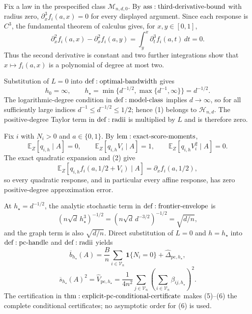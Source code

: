 Fix a law in the prespecified class \(\mathcal M_{n,d,0}\).  By \({\rm ass:third\text{-}derivative\text{-}bound}\) with radius zero, \(\partial_x^3f_i(a,x)=0\) for every displayed argument.  Since each response is \(C^3\), the fundamental theorem of calculus gives, for \(x,y\in[0,1]\),
\[
 \partial_x^2f_i(a,x)-\partial_x^2f_i(a,y)
 =\int_y^x\partial_t^3f_i(a,t)\,dt=0.
\]
Thus the second derivative is constant and two further integrations show that \(x\mapsto f_i(a,x)\) is a polynomial of degree at most two.

Substitution of \(L=0\) into \({\rm def:optimal\text{-}bandwidth}\) gives
\[
 h_0=\infty,
 \qquad h_\star=\min\{d^{-1/2},\max\{d^{-1},\infty\}\}=d^{-1/2}.
\tag{1}
\]
The logarithmic-degree condition in \({\rm def:model\text{-}class}\) implies \(d\to\infty\), so for all sufficiently large indices \(d^{-1}\leq d^{-1/2}\leq1/2\); hence (1) belongs to \(\mathcal H_{n,d}\).  The positive-degree Taylor term in \({\rm def:radii}\) is multiplied by \(L\) and is therefore zero.

Fix \(i\) with \(N_i>0\) and \(a\in\{0,1\}\).  By \({\rm lem:exact\text{-}score\text{-}moments}\),
\[
 \mathbb E_Z[q_{i,h}\mid A]=0,
 \qquad \mathbb E_Z[q_{i,h}V_i\mid A]=1,
 \qquad \mathbb E_Z[q_{i,h}V_i^2\mid A]=0.
\tag{2}
\]
The exact quadratic expansion and (2) give
\[
 \mathbb E_Z[q_{i,h}f_i(a,1/2+V_i)\mid A]=\partial_xf_i(a,1/2),
\tag{3}
\]
so every quadratic response, and in particular every affine response, has zero positive-degree approximation error.

At \(h_\star=d^{-1/2}\), the analytic stochastic term in \({\rm def:frontier\text{-}envelope}\) is
\[
 (n\sqrt d\,h_\star^3)^{-1/2}
 =(n\sqrt d\,d^{-3/2})^{-1/2}=\sqrt{d/n},
\tag{4}
\]
and the graph term is also \(\sqrt{d/n}\).  Direct substitution of \(L=0\) and \(h=h_\star\) into \({\rm def:pc\text{-}handle}\) and \({\rm def:radii}\) yields
\[
 \overline b_{h_\star}(A)
 =\frac Bn\sum_{i\in\mathcal V_n}\mathbf1\{N_i=0\}
 +\widehat\Delta_{\mathrm{pc},h_\star},
\tag{5}
\]
\[
 \overline s_{h_\star}(A)^2
 =\widehat V_{\mathrm{pc},h_\star}
 =\frac1{4n^2}\sum_{j\in\mathcal V_n}
 \left(\sum_{i\in\mathcal V_n}\beta_{ij,h_\star}\right)^2.
\tag{6}
\]
The certification in \({\rm thm:explicit\text{-}pc\text{-}conditional\text{-}certificate}\) makes (5)--(6) the complete conditional certificates; no asymptotic order for (6) is used.

